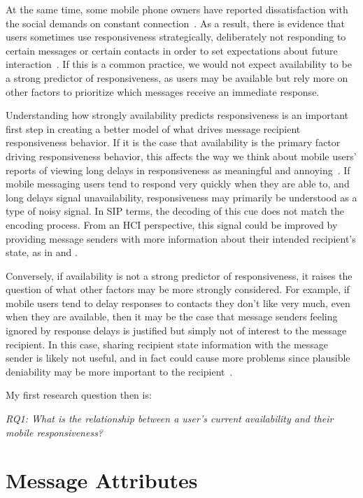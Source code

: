 \documentclass[12pt]{nuthesis}	%
\begin{document}
At the same time, some mobile phone owners have reported dissatisfaction with the social demands on constant connection~\citep{ames2013managing,baym2015personal}. As a result, there is evidence that users sometimes use responsiveness strategically, deliberately not responding to certain messages or certain contacts in order to set expectations about future interaction~\citep{tyler2003can,wohn2015ambient}. If this is a common practice, we would not expect availability to be a strong predictor of responsiveness, as users may be available but rely more on other factors to prioritize which messages receive an immediate response.

Understanding how strongly availability predicts responsiveness is an important first step in creating a better model of what drives message recipient responsiveness behavior. If it is the case that availability is the primary factor driving responsiveness behavior, this affects the way we think about mobile users' reports of viewing long delays in responsiveness as meaningful and annoying~\citep{church2013s,laursen2005please,rettie2009mobile}. If mobile messaging users tend to respond very quickly when they are able to, and long delays signal unavailability, responsiveness may primarily be understood as a type of noisy signal. In SIP terms, the decoding of this cue does not match the encoding process. From an HCI perspective, this signal could be improved by providing message senders with more information about their intended recipient's state, as in \citet{avrahami2007improving} and \citet{pielot2014didn}.

Conversely, if availability is not a strong predictor of responsiveness, it raises the question of what other factors may be more strongly considered. For example, if mobile users tend to delay responses to contacts they don't like very much, even when they are available, then it may be the case that message senders feeling ignored by response delays is justified but simply not of interest to the message recipient. In this case, sharing recipient state information with the message sender is likely not useful, and in fact could cause more problems since plausible deniability may be more important to the recipient~\citep{aoki2005making}.

My first research question then is:

\textit{RQ1: What is the relationship between a user's current availability and their mobile responsiveness?}

\section{Message Attributes}
\end{document}
